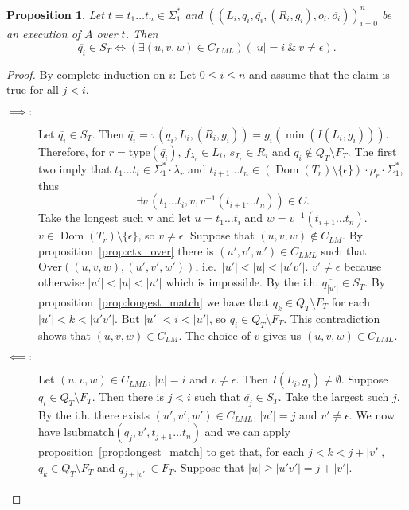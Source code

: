 \documentclass{article}
\newtheorem{proposition}[definition]{Proposition}
\newcommand{\len}[1]{\ensuremath{\left| #1 \right|}}
\DeclareMathOperator{\Dom}{Dom}
\begin{document}
	\begin{proposition} \label{prop:leftmost_match}
		Let $t=t_1\ldots t_n\in \Sigma_1^*$ and $((L_i, q_i, \overline{q_i}, (R_i, g_i), o_i, \overline{o_i}))_{i=0}^n$ be an execution of $A$ over $t$. Then
		\[ \overline{q_i}\in S_T \iff (\exists (u, v, w)\in C_{LML})(\len{u}=i\ \&\ v\ne\epsilon). \]
	\end{proposition}
	\begin{proof}
		By complete induction on $i$: Let $0\le i\le n$ and assume that the claim is true for all $j < i$.
		\begin{description}
			\item[$\implies:$]
				Let $\overline{q_i}\in S_T$. Then $\overline{q_i} = \tau(q_i, L_i, (R_i, g_i)) = g_i(\min(I(L_i, g_i)))$.
				Therefore, for $r = \mathrm{type}(\overline{q_i})$, $f_{\lambda_{r}}\in L_i$, $s_{T_r}\in R_i$ and $q_i\notin Q_T\setminus F_T$.
				The first two imply that $t_1\ldots t_i\in \Sigma_1^*\cdot \lambda_{r}$ and $t_{i+1}\ldots t_n\in(\Dom(T_r)\setminus\{\epsilon\})\cdot \rho_r\cdot \Sigma_1^*$, thus
				\[ \exists v\,(t_1\ldots t_i, v, v^{-1}(t_{i+1}\ldots t_n))\in C. \]
				Take the longest such v and let $u=t_1\ldots t_i$ and $w=v^{-1}(t_{i+1}\ldots t_n)$.
				$v\in \Dom(T_r)\setminus\{\epsilon\}$, so $v\ne\epsilon$.
				Suppose that $(u, v, w)\notin C_{LM}$. By proposition~\ref{prop:ctx_over} there is $(u', v', w')\in C_{LML}$ such that $\mathrm{Over}((u, v, w), (u', v', w'))$, i.e.\ $\len{u'} < \len{u} < \len{u'v'}$. $v'\ne\epsilon$ because otherwise $\len{u'} < \len{u} < \len{u'}$ which is impossible.
				By the i.h. $\overline{q_{\len{u'}}}\in S_T$. By proposition~\ref{prop:longest_match} we have that $q_k\in Q_T\setminus F_T$ for each $\len{u'} < k < \len{u'v'}$.
				But $\len{u'} < i < \len{u'}$, so $q_i\in Q_T\setminus F_T$. This contradiction shows that $(u, v, w)\in C_{LM}$. The choice of $v$ gives us $(u, v, w)\in C_{LML}$.
			\item[$\impliedby:$]
				Let $(u, v, w)\in C_{LML}$, $\len{u}=i$ and $v\ne\epsilon$. Then $I(L_i, g_i)\ne\emptyset$.
				Suppose $q_i\in Q_T\setminus F_T$. Then there is $j<i$ such that $\overline{q_j}\in S_T$. Take the largest such $j$.
				By the i.h. there exists $(u', v', w')\in C_{LML}$, $\len{u'}=j$ and $v'\ne\epsilon$.
				We now have $\mathrm{lsubmatch}(\overline{q_j}, v', t_{j+1}\ldots t_n)$ and we can apply proposition~\ref{prop:longest_match} to get that,
				for each $j < k < j+\len{v'}$, $q_k\in Q_T\setminus F_T$ and $q_{j+\len{v'}}\in F_T$.
				Suppose that $\len{u}\ge \len{u'v'} = j+\len{v'}$.

\end{description}
\end{proof}
\end{document}
